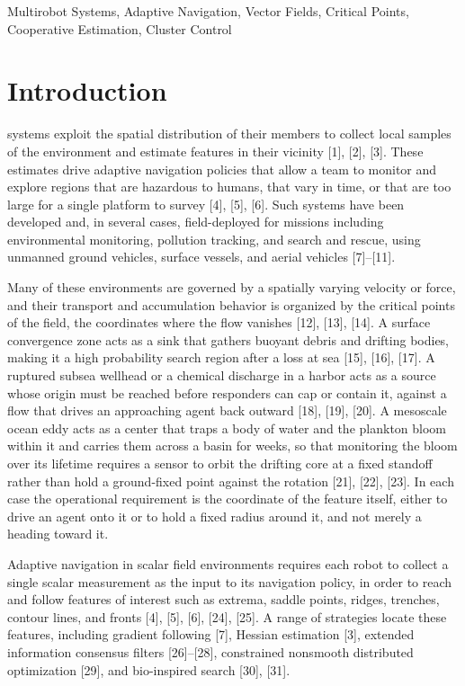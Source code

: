 \documentclass[lettersize,journal]{IEEEtran}
\begin{document}
\begin{IEEEkeywords}
Multirobot Systems, Adaptive Navigation, Vector Fields, Critical Points, Cooperative Estimation, Cluster Control
\end{IEEEkeywords}


\section{Introduction}

 systems exploit the spatial distribution of their members to collect local samples of the environment and estimate features in their vicinity [1], [2], [3]. These estimates drive adaptive navigation policies that allow a team to monitor and explore regions that are hazardous to humans, that vary in time, or that are too large for a single platform to survey [4], [5], [6]. Such systems have been developed and, in several cases, field-deployed for missions including environmental monitoring, pollution tracking, and search and rescue, using unmanned ground vehicles, surface vessels, and aerial vehicles [7]--[11].

Many of these environments are governed by a spatially varying velocity or force, and their transport and accumulation behavior is organized by the critical points of the field, the coordinates where the flow vanishes [12], [13], [14]. A surface convergence zone acts as a sink that gathers buoyant debris and drifting bodies, making it a high probability search region after a loss at sea [15], [16], [17]. A ruptured subsea wellhead or a chemical discharge in a harbor acts as a source whose origin must be reached before responders can cap or contain it, against a flow that drives an approaching agent back outward [18], [19], [20]. A mesoscale ocean eddy acts as a center that traps a body of water and the plankton bloom within it and carries them across a basin for weeks, so that monitoring the bloom over its lifetime requires a sensor to orbit the drifting core at a fixed standoff rather than hold a ground-fixed point against the rotation [21], [22], [23]. In each case the operational requirement is the coordinate of the feature itself, either to drive an agent onto it or to hold a fixed radius around it, and not merely a heading toward it.

Adaptive navigation in scalar field environments requires each robot to collect a single scalar measurement as the input to its navigation policy, in order to reach and follow features of interest such as extrema, saddle points, ridges, trenches, contour lines, and fronts [4], [5], [6], [24], [25]. A range of strategies locate these features, including gradient following [7], Hessian estimation [3], extended information consensus filters [26]--[28], constrained nonsmooth distributed optimization [29], and bio-inspired search [30], [31].
\end{document}
